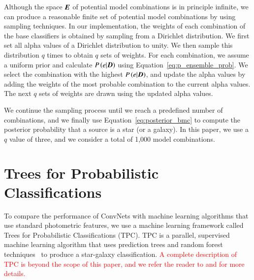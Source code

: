 \documentclass[fleqn,usenatbib]{mnras}
\newcommand{\changed}[1]{\textcolor{red}{#1}}
\begin{document}
Although the space $\bmath{E}$ of potential model combinations
is in principle infinite,
we can produce a reasonable finite set
of potential model combinations by using sampling techniques.
In our implementation,
the weights of each combination of the base classifiers
is obtained by sampling from a Dirichlet distribution.
We first set all alpha values of a Dirichlet distribution to unity.
We then sample this distribution $q$ times
to obtain $q$ sets of weights.
For each combination,
we assume a uniform prior and
calculate $P\left(e|\bmath{D}\right)$ using
Equation~\ref{eq:p_ensemble_prob}.
We select the combination with the highest $P\left(e|\bmath{D}\right)$,
and update the alpha values by
adding the weights of the most probable combination
to the current alpha values.
The next $q$ sets of weights are drawn
using the updated alpha values.

We continue the sampling process until
we reach a predefined number of combinations,
and we finally use Equation~\ref{eq:posterior_bmc} to compute
the posterior probability that a source is a star (or a galaxy).
In this paper, we use a $q$ value of three,
and we consider a total of 1,000 model combinations.

\section{Trees for Probabilistic Classifications}
  \label{sec:tpc}
  
To compare the performance of ConvNets with
machine learning algorithms that use standard photometric features,
we use a machine learning framework called
Trees for Probabilistic Classifications (TPC).
TPC is a parallel, supervised machine learning algorithm
that uses prediction trees and random forest 
techniques~\citep{breiman1984classification, breiman2001random}
to produce a star-galaxy classification.
\changed{
A complete description of TPC is beyond the scope of this paper, and
we refer the reader to
\cite{carrascokind2013tpz} and \cite{kim2015hybrid} for more details.
}
\end{document}
